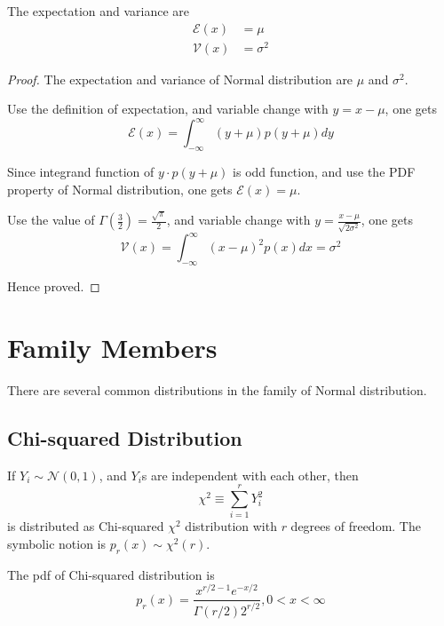The expectation and variance are
\begin{align*}
    \mathcal{E}(x) & = \mu      \\
    \mathcal{V}(x) & = \sigma^2
\end{align*}

\begin{proof}
    The expectation and variance of Normal distribution are $\mu$ and $\sigma^2$.

    Use the definition of expectation, and variable change with $y = x - \mu$, one gets
    \begin{equation*}
        \mathcal{E}(x) = \int_{-\infty}^{\infty} (y+\mu) p(y+\mu) dy
    \end{equation*}

    Since integrand function of $y \cdot p(y+\mu)$ is odd function,
    and use the PDF property of Normal distribution,
    one gets $\mathcal{E}(x) = \mu$.

    Use the value of $\Gamma(\frac{3}{2}) = \frac{\sqrt{\pi}}{2}$,
    and variable change with $y = \frac{x - \mu}{\sqrt{2 \sigma^2}}$,
    one gets
    \begin{equation*}
        \mathcal{V}(x) = \int_{-\infty}^{\infty}
        (x - \mu)^2 p(x) dx
        = \sigma^2
    \end{equation*}

    Hence proved.
\end{proof}

\section{Family Members}
There are several common distributions in the family of Normal distribution.

\subsection{Chi-squared Distribution}
If $Y_i \sim \mathcal{N}(0, 1)$, and $Y_i$s are independent with each other, then
\begin{equation}
    \chi^2 \equiv \sum_{i = 1}^{r} Y_i^2
\end{equation}
is distributed as Chi-squared \emph{$\chi^2$} distribution with $r$ degrees of freedom.
The symbolic notion is $p_r(x) \sim \chi^2(r)$.

The pdf of Chi-squared distribution is
\begin{equation}
    \label{Equation: Pdf of Chi-squared Distribution}
    p_r(x) = \frac{x^{r/2-1} e^{-x/2}}{\Gamma(r/2) 2^{r/2}}, 0 < x < \infty
\end{equation}

